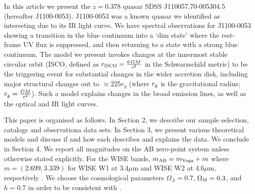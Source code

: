 \documentclass[a4paper,fleqn,usenatbib]{mnras}
\begin{document}
In this article we present the $z=0.378$ quasar SDSS
J110057.70-005304.5 (hereafter J1100-0053).  J1100-0053 was a known
quasar we identified as interesting due to its IR light curve. We have
spectral observations for J1100-0053 showing a transition in the blue
continuum into a `dim state' where the rest-frame UV flux is
suppressed, and then returning to a state with a strong blue
continuum. The model we present invokes changes at the innermost
stable circular orbit (ISCO, defined as $r_{\textsc{ISCO}}={\frac
{6\,GM}{c^{2}}}$ in the Schwarzschild metric) to be the triggering
event for substantial changes in the wider accretion disk, including
major structural changes out to $\approx$225$r_{g}$ (where $r_{\rm g}$ is the
gravitational radius; $r_{\rm g}=\frac{GM}{c^2}$). Such a model
explains changes in the broad emission lines, as well as the optical
and IR light curves.

This paper is organised as follows. In Section 2, we describe our
sample selection, catalogs and observationa data sets.  In Section 3,
we present various theoretical models and discuss if and how each
describes and explains the data.  We conclude in Section 4.  We report
all magnitudes on the AB zero-point system \citep{Oke_Gunn1983,
Fukugita1996} unless otherwise stated explicitly. For the WISE bands,
$m_{\rm AB} = m_{\rm Vega} + m$ where $m = (2.699, 3.339)$ for WISE W1
at 3.4$\mu$m and WISE W2 at 4.6$\mu$m, respectively
\citep{Cutri2011}. We choose the cosmological parameters
$\Omega_{\Lambda} = 0.7$, $\Omega_{\rm M} = 0.3$, and $h = 0.7$ in
order to be consistent with \citet{Shen2011}.
\end{document}

